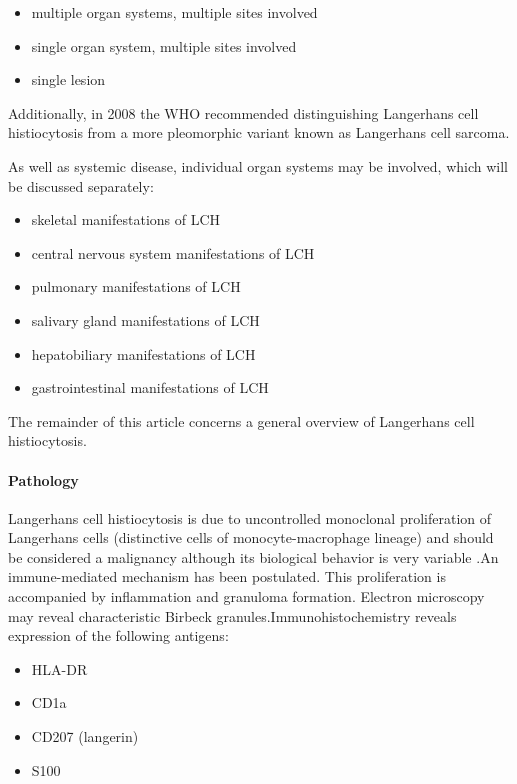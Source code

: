 \begin{itemize}
	\item
	multiple organ systems, multiple sites involved
	\item
	single organ system, multiple sites involved
	\item
	single lesion
\end{itemize}

Additionally, in 2008 the WHO recommended distinguishing Langerhans cell histiocytosis from a more pleomorphic variant known as Langerhans cell sarcoma.

As well as systemic disease, individual organ systems may be involved, which will be discussed separately:

\begin{itemize}
	\item
	skeletal manifestations of LCH
	\item
	central nervous system manifestations of LCH
	\item
	pulmonary manifestations of LCH
	\item
	salivary gland manifestations of LCH
	\item
	hepatobiliary manifestations of LCH
	\item
	gastrointestinal manifestations of LCH
\end{itemize}

The remainder of this article concerns a general overview of Langerhans cell histiocytosis.

\paragraph{Pathology}

Langerhans cell histiocytosis is due to uncontrolled monoclonal proliferation of Langerhans cells (distinctive cells of monocyte-macrophage lineage) and should be considered a malignancy although its biological behavior is very variable .An immune-mediated mechanism has been postulated. This proliferation is accompanied by inflammation and granuloma formation. Electron microscopy may reveal characteristic Birbeck granules.Immunohistochemistry reveals expression of the following antigens:

\begin{itemize}
	\item
	HLA-DR
	\item
	CD1a
	\item
	CD207 (langerin)
	\item
	S100
\end{itemize}

